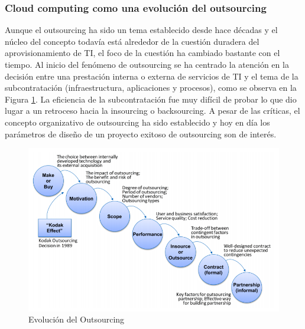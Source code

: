 \documentclass[a4paper, 12pt]{report}
\begin{document}
\subsubsection{Cloud computing como una evolución del outsourcing}
\begin{justify}
Aunque el outsourcing ha sido un tema establecido desde hace décadas y el núcleo del concepto todavía está alrededor de la cuestión duradera del aprovisionamiento de TI, el foco de la cuestión ha cambiado bastante con el tiempo. Al inicio del fenómeno de outsourcing se ha centrado la atención en la decisión entre una prestación interna o externa de servicios de TI y el tema de la subcontratación (infraestructura, aplicaciones y procesos), como se observa en la Figura \ref{fig:provisionTI}. La eficiencia de la subcontratación fue muy difícil de probar lo que dio lugar a un retroceso hacia la insourcing o backsourcing.
A pesar de las críticas, el concepto organizativo de outsourcing ha sido establecido y hoy en día los parámetros de diseño de un proyecto exitoso de outsourcing son de interés.
\end{justify}
\begin{figure}[ht]
	\begin{center}
		\includegraphics[width=1\textwidth]{provisionTI}
		\caption{Evolución del Outsourcing}
		\label{fig:provisionTI}
	\end{center}
\end{figure}
\end{document}
